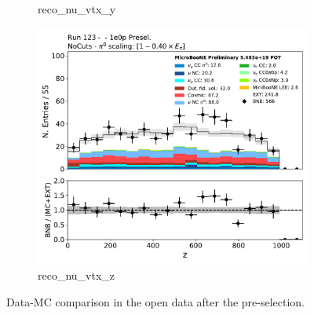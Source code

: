 \begin{figure}[H]
\begin{center}
\begin{subfigure}[b]{0.3\textwidth}
    \caption{\label{fig:1e0p:dataMCRun1:reco_nu_vtx_y} reco\_nu\_vtx\_y}
    \end{subfigure}
    \begin{subfigure}[b]{0.3\textwidth}
    \centering
    \includegraphics[width=1.00\textwidth]{1e0p/dataMCRun123/reco_nu_vtx_z.pdf}
    \caption{\label{fig:1e0p:dataMCRun1:reco_nu_vtx_z} reco\_nu\_vtx\_z}
    \end{subfigure}
\caption{\label{fig:1e0p:dataMCRun1:reco_nu_vtx}Data-MC comparison in the open data after the \zpsel pre-selection.}
\end{center}
\end{figure}

